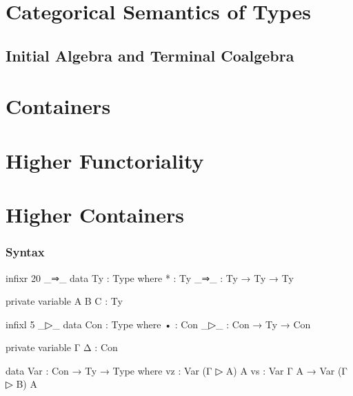 \section{Categorical Semantics of Types}

\subsection{Initial Algebra and Terminal Coalgebra}

\section{Containers}

\begin{code}

\end{code}

\section{Higher Functoriality}

\section{Higher Containers}

\subsubsection*{Syntax}

\begin{code}
infixr 20 _⇒_
data Ty : Type where
  * : Ty
  _⇒_ : Ty → Ty → Ty
\end{code}

\begin{code}[hide]
private variable A B C : Ty
\end{code}

\begin{code}
infixl 5 _▷_
data Con : Type where
  •   : Con
  _▷_ : Con → Ty → Con
\end{code}

\begin{code}[hide]
private variable Γ Δ : Con
\end{code}

\begin{code}
data Var : Con → Ty → Type where
  vz : Var (Γ ▷ A) A
  vs : Var Γ A → Var (Γ ▷ B) A
\end{code}

